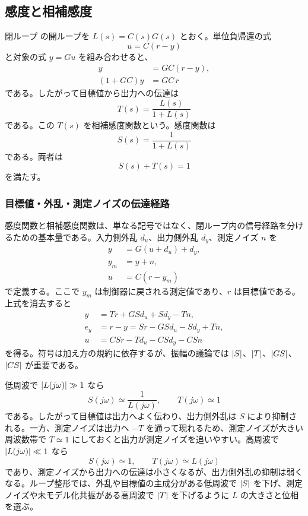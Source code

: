 \subsection{感度と相補感度}

閉ループ  の開ループを $L(s)=C(s)G(s)$ とおく。単位負帰還の式
\begin{equation}
  u=C(r-y)
\end{equation}
と対象の式 $y=Gu$ を組み合わせると、
\begin{align}
  y&=GC(r-y),\\
  (1+GC)y&=GC\,r
\end{align}
である。したがって目標値から出力への伝達は
\begin{equation}
  T(s)=\frac{L(s)}{1+L(s)}
\end{equation}
である。この $T(s)$ を相補感度関数という。感度関数は
\begin{equation}
  S(s)=\frac{1}{1+L(s)}
\end{equation}
である。両者は
\begin{equation}
  S(s)+T(s)=1
\end{equation}
を満たす。

\subsubsection{目標値・外乱・測定ノイズの伝達経路}

感度関数と相補感度関数は、単なる記号ではなく、閉ループ内の信号経路を分けるための基本量である。入力側外乱 $d_u$、出力側外乱 $d_y$、測定ノイズ $n$ を
\begin{align}
  y&=G(u+d_u)+d_y,\\
  y_m&=y+n,\\
  u&=C(r-y_m)
\end{align}
で定義する。ここで $y_m$ は制御器に戻される測定値であり、$r$ は目標値である。上式を消去すると
\begin{align}
  y&=T r+G S d_u+S d_y-T n,\\
  e_y&=r-y=S r-G S d_u-S d_y+T n,\\
  u&=C S r-T d_u-C S d_y-C S n
\end{align}
を得る。符号は加え方の規約に依存するが、振幅の議論では $\left|S\right|$、$\left|T\right|$、$\left|GS\right|$、$\left|CS\right|$ が重要である。

低周波で $\left|L(j\omega)\right|\gg1$ なら
\begin{equation}
  S(j\omega)\simeq \frac{1}{L(j\omega)},\qquad
  T(j\omega)\simeq 1
\end{equation}
である。したがって目標値は出力へよく伝わり、出力側外乱は $S$ により抑制される。一方、測定ノイズは出力へ $-T$ を通って現れるため、測定ノイズが大きい周波数帯で $T\simeq1$ にしておくと出力が測定ノイズを追いやすい。高周波で $\left|L(j\omega)\right|\ll1$ なら
\begin{equation}
  S(j\omega)\simeq1,\qquad
  T(j\omega)\simeq L(j\omega)
\end{equation}
であり、測定ノイズから出力への伝達は小さくなるが、出力側外乱の抑制は弱くなる。ループ整形では、外乱や目標値の主成分がある低周波で $\left|S\right|$ を下げ、測定ノイズや未モデル化共振がある高周波で $\left|T\right|$ を下げるように $L$ の大きさと位相を選ぶ。

